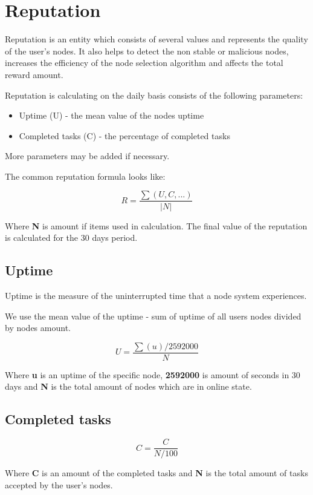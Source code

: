 \section{Reputation}

Reputation is an entity which consists of several values and represents the quality of the user's nodes.
It also helps to detect the non stable or malicious nodes,
increases the efficiency of the node selection algorithm and
affects the total reward amount.

Reputation is calculating on the daily basis consists of the following parameters:

\begin{itemize}
    \item Uptime (U) - the mean value of the nodes uptime
    \item Completed tasks (C) - the percentage of completed tasks
\end{itemize}

More parameters may be added if necessary.

The common reputation formula looks like:

\[
    R = \frac{\sum(U, C, ...)}{\vert{N}\vert}
\]

Where \textbf{N} is amount if items used in calculation.
The final value of the reputation is calculated for the 30 days period.

\subsection{Uptime}

Uptime is the measure of the uninterrupted time that a node system experiences.

We use the mean value of the uptime - sum of uptime of all users nodes divided by nodes amount.

\[
    U = \frac{\sum(u) / 2592000}{N}
\]

Where \textbf{u} is an uptime of the specific node, \textbf{2592000} is amount of seconds in 30 days and \textbf{N} is the total amount of nodes which are in online state.

\subsection{Completed tasks}

\[
    C = \frac{C}{N / 100}
\]

Where \textbf{C} is an amount of the completed tasks and \textbf{N} is the total amount of tasks accepted by the user's nodes.

